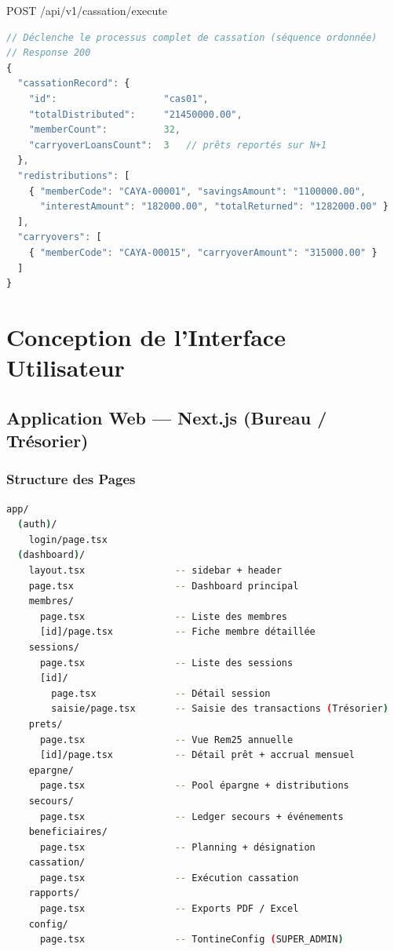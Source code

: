 \documentclass[12pt, a4paper]{report}
\begin{document}
\begin{apiBox}{POST /api/v1/cassation/execute }
\begin{lstlisting}[language=TypeScript, numbers=none]
// Déclenche le processus complet de cassation (séquence ordonnée)
// Response 200
{
  "cassationRecord": {
    "id":                   "cas01",
    "totalDistributed":     "21450000.00",
    "memberCount":          32,
    "carryoverLoansCount":  3   // prêts reportés sur N+1
  },
  "redistributions": [
    { "memberCode": "CAYA-00001", "savingsAmount": "1100000.00",
      "interestAmount": "182000.00", "totalReturned": "1282000.00" }
  ],
  "carryovers": [
    { "memberCode": "CAYA-00015", "carryoverAmount": "315000.00" }
  ]
}
\end{lstlisting}
\end{apiBox}

\chapter{Conception de l'Interface Utilisateur}

\section{Application Web — Next.js (Bureau / Trésorier)}

\subsection{Structure des Pages}

\begin{lstlisting}[language=bash, caption={Arborescence Next.js}]
app/
  (auth)/
    login/page.tsx
  (dashboard)/
    layout.tsx                -- sidebar + header
    page.tsx                  -- Dashboard principal
    membres/
      page.tsx                -- Liste des membres
      [id]/page.tsx           -- Fiche membre détaillée
    sessions/
      page.tsx                -- Liste des sessions
      [id]/
        page.tsx              -- Détail session
        saisie/page.tsx       -- Saisie des transactions (Trésorier)
    prets/
      page.tsx                -- Vue Rem25 annuelle
      [id]/page.tsx           -- Détail prêt + accrual mensuel
    epargne/
      page.tsx                -- Pool épargne + distributions
    secours/
      page.tsx                -- Ledger secours + événements
    beneficiaires/
      page.tsx                -- Planning + désignation
    cassation/
      page.tsx                -- Exécution cassation
    rapports/
      page.tsx                -- Exports PDF / Excel
    config/
      page.tsx                -- TontineConfig (SUPER_ADMIN)
\end{lstlisting}
\end{document}
